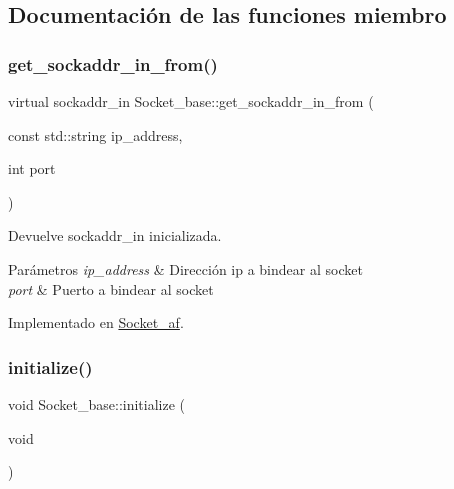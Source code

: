 \subsection{Documentación de las funciones miembro}
\mbox{\label{classSocket__base_a887249ae6a25693230c0febf403a2545}} 
\subsubsection{\texorpdfstring{get\+\_\+sockaddr\+\_\+in\+\_\+from()}{get\_sockaddr\_in\_from()}}
{\footnotesize\ttfamily virtual sockaddr\+\_\+in Socket\+\_\+base\+::get\+\_\+sockaddr\+\_\+in\+\_\+from (\begin{DoxyParamCaption}\item[{const std\+::string}]{ip\+\_\+address,  }\item[{int}]{port }\end{DoxyParamCaption})\hspace{0.3cm}{\ttfamily [pure virtual]}}



Devuelve sockaddr\+\_\+in inicializada. 


\begin{DoxyParams}{Parámetros}
{\em ip\+\_\+address} & Dirección ip a bindear al socket \\
\hline
{\em port} & Puerto a bindear al socket \\
\hline
\end{DoxyParams}


Implementado en \hyperlink{classSocket__af_aa2f8fb1398c1e6f66832151e8c5bcf2e}{Socket\+\_\+af}.

\mbox{\label{classSocket__base_af0b9f713f4d6231c287198034fad662e}} 
\subsubsection{\texorpdfstring{initialize()}{initialize()}}
{\footnotesize\ttfamily void Socket\+\_\+base\+::initialize (\begin{DoxyParamCaption}\item[{void}]{ }\end{DoxyParamCaption})}



